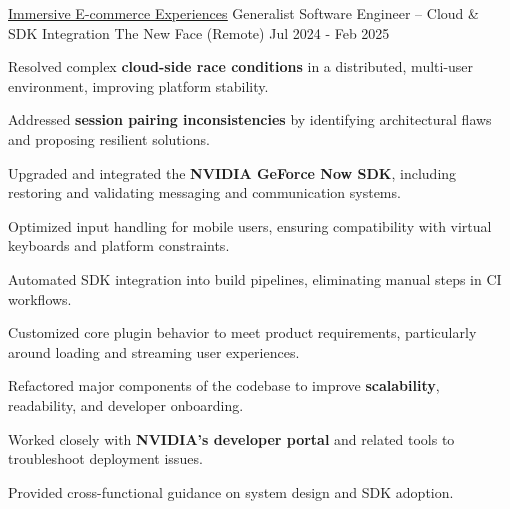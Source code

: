 
\begin{cventries}

  \cventry
    {\href{https://www.thenewface.io/}{\underline{Immersive E-commerce Experiences}}}
    {Generalist Software Engineer – Cloud \& SDK Integration}
    {The New Face (Remote)}
    {Jul 2024 - Feb 2025}
    {
      \begin{cvitems}
        \item {Resolved complex \textbf{cloud-side race conditions} in a distributed, multi-user environment, improving platform stability.}
        \item {Addressed \textbf{session pairing inconsistencies} by identifying architectural flaws and proposing resilient solutions.}
        \item {Upgraded and integrated the \textbf{NVIDIA GeForce Now SDK}, including restoring and validating messaging and communication systems.}
        \item {Optimized input handling for mobile users, ensuring compatibility with virtual keyboards and platform constraints.}
        \item {Automated SDK integration into build pipelines, eliminating manual steps in CI workflows.}
        \item {Customized core plugin behavior to meet product requirements, particularly around loading and streaming user experiences.}
        \item {Refactored major components of the codebase to improve \textbf{scalability}, readability, and developer onboarding.}
        \item {Worked closely with \textbf{NVIDIA's developer portal} and related tools to troubleshoot deployment issues.}
        \item {Provided cross-functional guidance on system design and SDK adoption.}
      \end{cvitems}
    }


\end{cventries}
